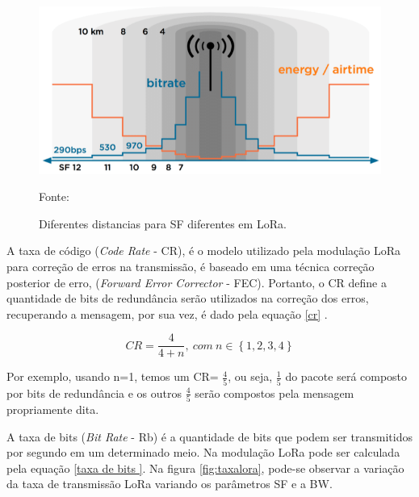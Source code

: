 \begin{figure}[H]
  \centering
  \includegraphics[width=\textwidth]{figuras/SFdistanci.png}
  \caption{Diferentes distancias para SF diferentes em LoRa. }
 { \footnotesize Fonte:\cite{lorasf}} 
  \label{fig:sfloraDISTANCIA}
\end{figure}

\par A taxa de código (\textit{Code Rate} - CR), é o modelo utilizado pela modulação LoRa para correção de erros na transmissão, é baseado em uma técnica correção posterior de erro, (\textit{Forward Error Corrector} - FEC). Portanto, o CR define a quantidade de bits de redundância serão utilizados na correção dos erros,  recuperando a mensagem, por sua vez, é dado pela equação \ref{cr} \cite{aplicacaolora}.

\begin{center}
\begin{equation}
\label{cr}
    CR=\frac{4}{4+n},\ com\  n \in \left\{1,2,3,4\right\}
\end{equation}
\end{center}

\par Por exemplo, usando n=1, temos um CR= $ \frac{4}{5}$, ou seja, $ \frac{1}{5}$ do pacote será composto por bits de redundância e os outros $ \frac{4}{5}$ serão compostos pela mensagem propriamente dita.

\par A taxa de bits (\textit{Bit Rate} - Rb) é a quantidade de bits que podem ser transmitidos por segundo em um determinado meio. Na modulação LoRa pode ser calculada pela equação \ref{taxa de bits }. Na figura \ref{fig:taxalora}, pode-se observar a variação da taxa de transmissão LoRa variando os parâmetros SF e a BW. 



